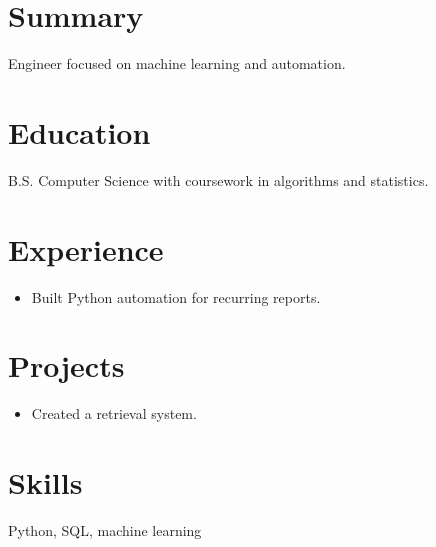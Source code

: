 \documentclass[10pt]{article}
\begin{document}
\section*{Summary}
Engineer focused on machine learning and automation.
\section*{Education}
B.S. Computer Science with coursework in algorithms and statistics.
\section*{Experience}
\begin{itemize}\item Built Python automation for recurring reports.\end{itemize}
\section*{Projects}
\begin{itemize}\item Created a retrieval system.\end{itemize}
\section*{Skills}
Python, SQL, machine learning
\end{document}
